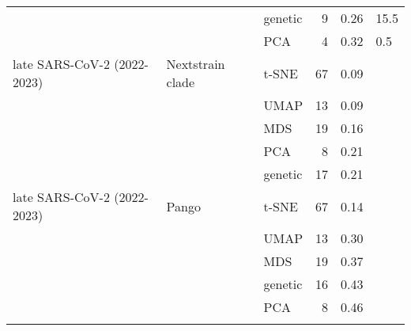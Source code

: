 \begin{tabular}{lllrrl}
                                        &                    & genetic &                   9 &                           0.26 &      15.5 \\
                                        &                    &     PCA &                   4 &                           0.32 &       0.5 \\
            late SARS-CoV-2 (2022-2023) &   Nextstrain clade &   t-SNE &                  67 &                           0.09 &           \\
                                        &                    &    UMAP &                  13 &                           0.09 &           \\
                                        &                    &     MDS &                  19 &                           0.16 &           \\
                                        &                    &     PCA &                   8 &                           0.21 &           \\
                                        &                    & genetic &                  17 &                           0.21 &           \\
            late SARS-CoV-2 (2022-2023) &              Pango &   t-SNE &                  67 &                           0.14 &           \\
                                        &                    &    UMAP &                  13 &                           0.30 &           \\
                                        &                    &     MDS &                  19 &                           0.37 &           \\
                                        &                    & genetic &                  16 &                           0.43 &           \\
                                        &                    &     PCA &                   8 &                           0.46 &           \\
\botrule
\end{tabular}
